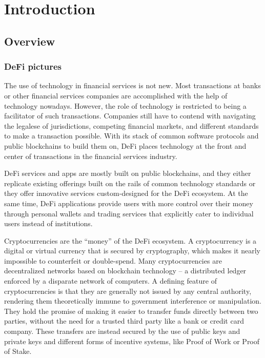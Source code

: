 \chapter{Introduction} \label{Introduction}
\minitoc

\section{Overview}

\subsection{DeFi pictures}

The use of technology in financial services is not new. Most transactions at banks or other financial services companies are accomplished with the help of technology nowadays. However, the role of technology is restricted to being a facilitator of such transactions. Companies still have to contend with navigating the legalese of jurisdictions, competing financial markets, and different standards to make a transaction possible. With its stack of common software protocols and public blockchains to build them on, DeFi places technology at the front and center of transactions in the financial services industry.

DeFi services and apps are mostly built on public blockchains, and they either replicate existing offerings built on the rails of common technology standards or they offer innovative services custom-designed for the DeFi ecosystem. At the same time, DeFi applications provide users with more control over their money through personal wallets and trading services that explicitly cater to individual users instead of institutions.

Cryptocurrencies are the “money” of the DeFi ecosystem. A cryptocurrency is a digital or virtual currency that is secured by cryptography, which makes it nearly impossible to counterfeit or double-spend. Many cryptocurrencies are decentralized networks based on blockchain technology – a distributed ledger enforced by a disparate network of computers. A defining feature of cryptocurrencies is that they are generally not issued by any central authority, rendering them theoretically immune to government interference or manipulation. They hold the promise of making it easier to transfer funds directly between two parties, without the need for a trusted third party like a bank or credit card company. These transfers are instead secured by the use of public keys and private keys and different forms of incentive systems, like Proof of Work or Proof of Stake.

